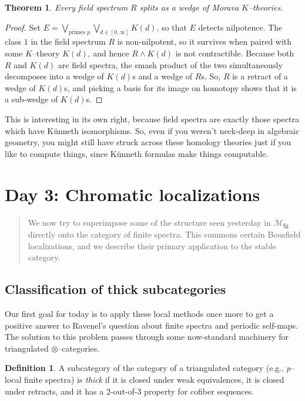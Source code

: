 \documentclass{amsart}
\newcommand{\<}{\langle}
\renewcommand{\>}{\rangle}
\newcommand{\sm}{\wedge}
\newcommand{\moduli}[1]{\mathcal{M}_{\mathbf{#1}}}
\theoremstyle{plain}
\newtheorem*{theorem}{Theorem}
\theoremstyle{definition}
\newtheorem*{definition}{Definition}
\theoremstyle{remark}
\begin{document}
\begin{theorem}
Every field spectrum $R$ splits as a wedge of Morava $K$--theories.
\end{theorem}
\begin{proof}
Set $E = \bigvee_{\text{primes $p$}} \bigvee_{d \in [0, \infty]} K(d)$, so that $E$ detects nilpotence.  The class $1$ in the field spectrum $R$ is non-nilpotent, so it survives when paired with some $K$--theory $K(d)$, and hence $R \sm K(d)$ is not contractible.  Because both $R$ and $K(d)$ are field spectra, the smash product of the two simultaneously decomposes into a wedge of $K(d)$s and a wedge of $R$s.  So, $R$ is a retract of a wedge of $K(d)$s, and picking a basis for its image on homotopy shows that it is a sub-wedge of $K(d)$s.
\end{proof}

\noindent This is interesting in its own right, because field spectra are exactly those spectra which have K\"unneth isomorphisms.  So, even if you weren't neck-deep in algebraic geometry, you might still have struck across these homology theories just if you like to compute things, since K\"unneth formulas make things computable.






\newpage
\section{Day 3: Chromatic localizations}

\begin{abstract}
We now try to superimpose some of the structure seen yesterday in $\moduli{fg}$ directly onto the category of finite spectra.  This summons certain Bousfield localizations, and we describe their primary application to the stable category.
\end{abstract}


\subsection{Classification of thick subcategories}

Our first goal for today is to apply these local methods once more to get a positive answer to Ravenel's question about finite spectra and periodic self-maps.  The solution to this problem passes through some now-standard machinery for triangulated $\otimes$--categories.

\begin{definition}
A subcategory of the category of a triangulated category (e.g., $p$--local finite spectra) is \textit{thick} if it is closed under weak equivalences, it is closed under retracts, and it has a $2$-out-of-$3$ property for cofiber sequences.
\end{definition}
\end{document}
